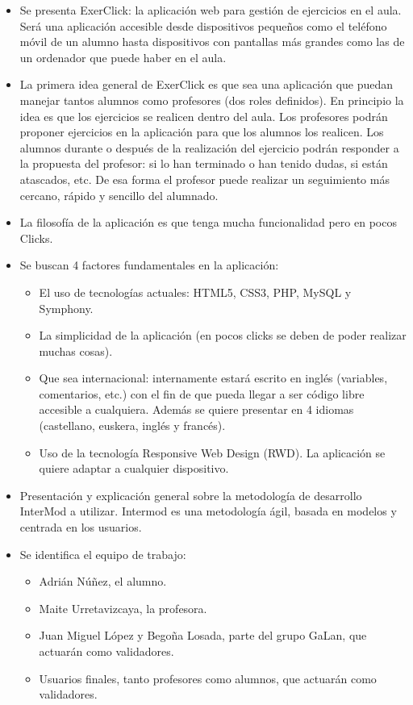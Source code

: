 \begin{itemize}
\item Se presenta ExerClick: la aplicación web para gestión de ejercicios en el aula. Será una aplicación accesible desde dispositivos pequeños como el teléfono móvil de un alumno hasta dispositivos con pantallas más grandes como las de un ordenador que puede haber en el aula.

\item La primera idea general de ExerClick es que sea una aplicación que puedan manejar tantos alumnos como profesores (dos roles definidos). En principio la idea es que los ejercicios se realicen dentro del aula. Los profesores podrán proponer ejercicios en la aplicación para que los alumnos los realicen. Los alumnos durante o después de la realización del ejercicio podrán responder a la propuesta del profesor: si lo han terminado o han tenido dudas, si están atascados, etc. De esa forma el profesor puede realizar un seguimiento más cercano, rápido y sencillo del alumnado.

\item La filosofía de la aplicación es que tenga mucha funcionalidad pero en pocos Clicks.

\item Se buscan 4 factores fundamentales en la aplicación:
\begin{itemize}
	\item El uso de tecnologías actuales: HTML5, CSS3, PHP, MySQL y Symphony.
	\item La simplicidad de la aplicación (en pocos clicks se deben de poder realizar muchas cosas).
	\item Que sea internacional: internamente estará escrito en inglés (variables, comentarios, etc.) con el fin de que 		pueda llegar a ser código libre accesible a cualquiera. Además se quiere presentar en 4 idiomas (castellano, euskera, 		inglés y francés).
	\item Uso de la tecnología Responsive Web Design (RWD). La aplicación se quiere adaptar a cualquier dispositivo.
\end{itemize}

\item Presentación y explicación general sobre la metodología de desarrollo InterMod a utilizar.
Intermod es una metodología ágil, basada en modelos y centrada en los usuarios.

\item Se identifica el equipo de trabajo:
\begin{itemize}
\item Adrián Núñez, el alumno.
\item Maite Urretavizcaya, la profesora.
\item Juan Miguel López y Begoña Losada, parte del grupo GaLan, que actuarán como validadores.
\item Usuarios finales, tanto profesores como alumnos, que actuarán como validadores.
\end{itemize}
\end{itemize}

